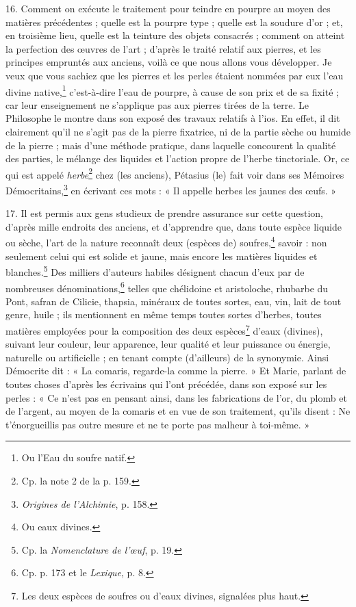 \documentclass[a4paper, 11pt, oneside, polutonikogreek, french]{article}
\begin{document}
16. Comment on exécute le traitement pour teindre en pourpre au moyen des matières précédentes ; quelle est la pourpre type ; quelle est la soudure d'or ; et, en troisième lieu, quelle est la teinture des objets consacrés ; comment on atteint la perfection des œuvres de l'art ; d'après le traité relatif aux pierres, et les principes empruntés aux anciens, voilà ce que nous allons vous développer. Je veux que vous sachiez que les pierres et les perles étaient nommées par eux l'eau divine native,\footnote{Ou l'Eau du soufre natif.} c'est-à-dire l'eau de pourpre, à cause de son prix et de sa fixité ; car leur enseignement ne s'applique pas aux pierres tirées de la terre. Le Philosophe le montre dans son exposé des travaux relatifs à l'ios. En effet, il dit clairement qu'il ne s'agit pas de la pierre fixatrice, ni de la partie sèche ou humide de la pierre ; mais d'une méthode pratique, dans laquelle concourent la qualité des parties, le mélange des liquides et l'action propre de l'herbe tinctoriale. Or, ce qui est appelé \emph{herbe}\footnote{Cp. la note 2 de la p. 159.} chez (les anciens), Pétasius (le) fait voir dans ses Mémoires Démocritains,\footnote{\emph{Origines de l'Alchimie}, p. 158.} en écrivant ces mots : « Il appelle herbes les jaunes des œufs. »

17. Il est permis aux gens studieux de prendre assurance sur cette question, d'après mille endroits des anciens, et d'apprendre que, dans toute espèce liquide ou sèche, l'art de la nature reconnaît deux (espèces de) soufres,\footnote{Ou eaux divines.} savoir : non seulement celui qui est solide et jaune, mais encore les matières liquides et blanches.\footnote{Cp. la \emph{Nomenclature de l'œuf}, p. 19.} Des milliers d'auteurs habiles désignent chacun d'eux par de nombreuses dénominations,\footnote{Cp. p. 173 et le \emph{Lexique}, p. 8.} telles que chélidoine et aristoloche, rhubarbe du Pont, safran de Cilicie, thapsia, minéraux de toutes sortes, eau, vin, lait de tout genre, huile ; ils mentionnent en même temps toutes sortes d'herbes, toutes matières employées pour la composition des deux espèces\footnote{Les deux espèces de soufres ou d'eaux divines, signalées plus haut.} d'eaux (divines), suivant leur couleur, leur apparence, leur qualité et leur puissance ou énergie, naturelle ou artificielle ; en tenant compte (d'ailleurs) de la synonymie. Ainsi Démocrite dit : « La comaris, regarde-la comme la pierre. » Et Marie, parlant de toutes choses d'après les écrivains qui l'ont précédée, dans son exposé sur les perles : « Ce n'est pas en pensant ainsi, dans les fabrications de l'or, du plomb et de l'argent, au moyen de la comaris et en vue de son traitement, qu'ils disent : Ne t'énorgueillis pas outre mesure et ne te porte pas malheur à toi-même. »
\end{document}
